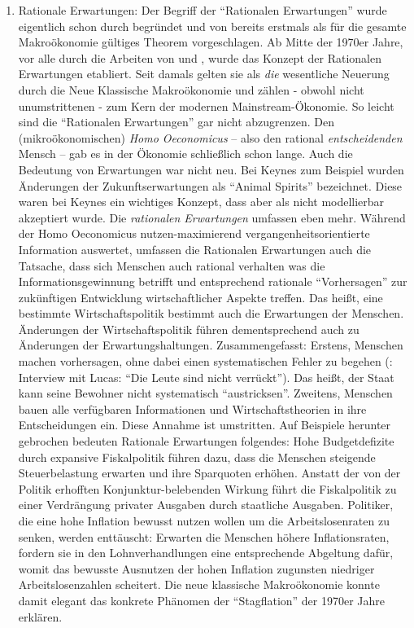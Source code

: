 \begin{enumerate}
	\item Rationale Erwartungen: Der Begriff der "`Rationalen Erwartungen"' wurde eigentlich schon durch \textcite{Muth1961} begründet und von \textcite{Lucas1972} bereits erstmals als für die gesamte Makroökonomie gültiges Theorem vorgeschlagen. Ab Mitte der 1970er Jahre, vor alle durch die Arbeiten von \textcite{Lucas1976} und \textcite{Sargent1975}, wurde das Konzept der Rationalen Erwartungen etabliert. Seit damals gelten sie als \textit{die} wesentliche Neuerung durch die Neue Klassische Makroökonomie und zählen - obwohl nicht unumstrittenen - zum Kern der modernen Mainstream-Ökonomie. So leicht sind die "`Rationalen Erwartungen"' gar nicht abzugrenzen. Den (mikroökonomischen) \textit{Homo Oeconomicus} -- also den rational \textit{entscheidenden} Mensch -- gab es in der Ökonomie schließlich schon lange. Auch die Bedeutung von Erwartungen war nicht neu. Bei Keynes zum Beispiel wurden Änderungen der Zukunftserwartungen als "`Animal Spirits"' bezeichnet. Diese waren bei Keynes ein wichtiges Konzept, dass aber als nicht modellierbar akzeptiert wurde. Die \textit{rationalen Erwartungen} umfassen eben mehr. Während der Homo Oeconomicus nutzen-maximierend vergangenheitsorientierte Information auswertet, umfassen die Rationalen Erwartungen auch die Tatsache, dass sich Menschen auch rational verhalten was die Informationsgewinnung betrifft und entsprechend rationale "`Vorhersagen"' zur zukünftigen Entwicklung wirtschaftlicher Aspekte treffen. Das heißt, eine bestimmte Wirtschaftspolitik bestimmt auch die Erwartungen der Menschen. Änderungen der Wirtschaftspolitik führen dementsprechend auch zu Änderungen der Erwartungshaltungen. Zusammengefasst: Erstens, Menschen machen vorhersagen, ohne dabei einen systematischen Fehler zu begehen (\textcite{Lucas2013}: Interview mit Lucas: "`Die Leute sind nicht verrückt"'). Das heißt, der Staat kann seine Bewohner nicht systematisch "`austricksen"'. Zweitens, Menschen bauen alle verfügbaren Informationen und Wirtschaftstheorien in ihre Entscheidungen ein. Diese Annahme ist umstritten. Auf Beispiele herunter gebrochen bedeuten Rationale Erwartungen folgendes:
	Hohe Budgetdefizite durch expansive Fiskalpolitik führen dazu, dass die Menschen steigende Steuerbelastung erwarten und ihre Sparquoten erhöhen. Anstatt der von der Politik erhofften Konjunktur-belebenden Wirkung führt die Fiskalpolitik zu einer Verdrängung privater Ausgaben durch staatliche Ausgaben. Politiker, die eine hohe Inflation bewusst nutzen wollen um die Arbeitslosenraten zu senken, werden enttäuscht: Erwarten die Menschen höhere Inflationsraten, fordern sie in den Lohnverhandlungen eine entsprechende Abgeltung dafür, womit das bewusste Ausnutzen der hohen Inflation zugunsten niedriger Arbeitslosenzahlen scheitert. Die neue klassische Makroökonomie konnte damit elegant das konkrete Phänomen der "`Stagflation"' der 1970er Jahre erklären. 	 

\end{enumerate}
